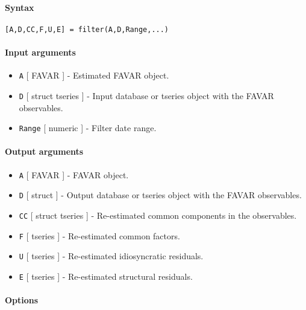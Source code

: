 


	\paragraph{Syntax}\label{syntax}

\begin{verbatim}
[A,D,CC,F,U,E] = filter(A,D,Range,...)
\end{verbatim}

\paragraph{Input arguments}\label{input-arguments}

\begin{itemize}
\item
  \texttt{A} {[} FAVAR {]} - Estimated FAVAR object.
\item
  \texttt{D} {[} struct \textbar{} tseries {]} - Input database or
  tseries object with the FAVAR observables.
\item
  \texttt{Range} {[} numeric {]} - Filter date range.
\end{itemize}

\paragraph{Output arguments}\label{output-arguments}

\begin{itemize}
\item
  \texttt{A} {[} FAVAR {]} - FAVAR object.
\item
  \texttt{D} {[} struct {]} - Output database or tseries object with the
  FAVAR observables.
\item
  \texttt{CC} {[} struct \textbar{} tseries {]} - Re-estimated common
  components in the observables.
\item
  \texttt{F} {[} tseries {]} - Re-estimated common factors.
\item
  \texttt{U} {[} tseries {]} - Re-estimated idiosyncratic residuals.
\item
  \texttt{E} {[} tseries {]} - Re-estimated structural residuals.
\end{itemize}

\paragraph{Options}\label{options}

